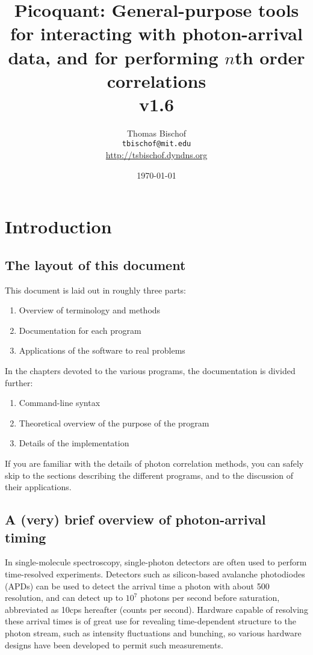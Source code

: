 \documentclass{book}
\title{Picoquant: General-purpose tools for interacting with photon-arrival data, and for performing $n$th order correlations \\ 
v1.6}
\author{Thomas Bischof \\ \texttt{tbischof@mit.edu} \\ \url{http://tsbischof.dyndns.org}}
\date{\today}
\newcommand{\cps}{\textnormal{cps}}
\numberwithin{equation}{section}
\numberwithin{figure}{section}
\begin{document}
\maketitle
\tableofcontents


\newpage
 
\chapter{Introduction}
\section{The layout of this document}
This document is laid out in roughly three parts:
\begin{enumerate}
\item Overview of terminology and methods
\item Documentation for each program
\item Applications of the software to real problems
\end{enumerate}
In the chapters devoted to the various programs, the documentation is divided further:
\begin{enumerate}
\item Command-line syntax
\item Theoretical overview of the purpose of the program
\item Details of the implementation
\end{enumerate}
If you are familiar with the details of photon correlation methods, you can safely skip to the sections describing the different programs, and to the discussion of their applications. 

\section{A (very) brief overview of photon-arrival timing}
In single-molecule spectroscopy, single-photon detectors are often used to perform time-resolved experiments. Detectors such as silicon-based avalanche photodiodes (APDs) can be used to detect the arrival time a photon with about 500\pico\second{} resolution, and can detect up to $10^{7}$ photons per second before saturation, abbreviated as 10\mega\cps{} hereafter (counts per second). Hardware capable of resolving these arrival times is of great use for revealing time-dependent structure to the photon stream, such as intensity fluctuations and bunching, so various hardware designs have been developed to permit such measurements.
\end{document}
